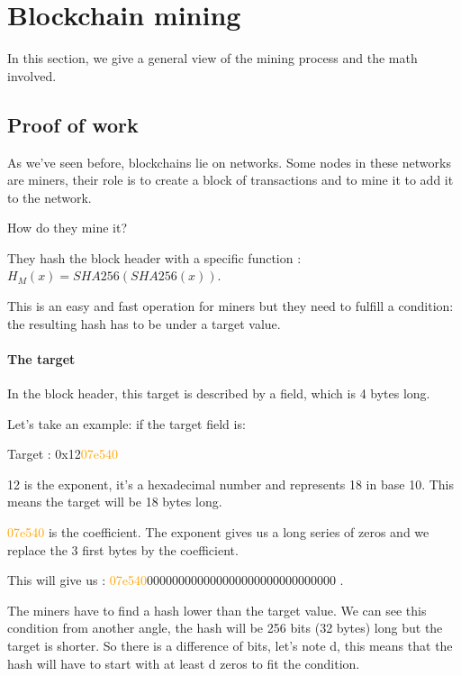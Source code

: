 \section{Blockchain mining} \label{mining}

In this section, we give a general view of the mining process and the math involved.

  \subsection{Proof of work}

As we've seen before, blockchains lie on networks. Some nodes in these networks are miners, their role is to create a block of transactions and to mine it to add it to the network. \newline

How do they mine it? \newline

They hash the block header with a specific function : $H_M(x) = SHA256(SHA256(x))$.

This is an easy and fast operation for miners but they need to fulfill a condition: the resulting hash has to be under a target value.

  \paragraph{The target} \label{target}

In the block header, this target is described by a field, which is 4 bytes long.

Let's take an example: if the target field is: \newline

Target : 0x12\textcolor{orange}{07e540} \newline

12 is the exponent, it's a hexadecimal number and represents 18 in base 10. This means the target will be 18 bytes long.

\textcolor{orange}{07e540} is the coefficient. The exponent gives us a long series of zeros and we replace the 3 first bytes by the coefficient. \newline

This will give us : \textcolor{orange}{07e540}000000000000000000000000000000 . \newline

The miners have to find a hash lower than the target value. We can see this condition from another angle, the hash will be 256 bits (32 bytes) long but the target is shorter. So there is a difference of bits, let's note d, this means that the hash will have to start with at least d zeros to fit the condition. \newline

